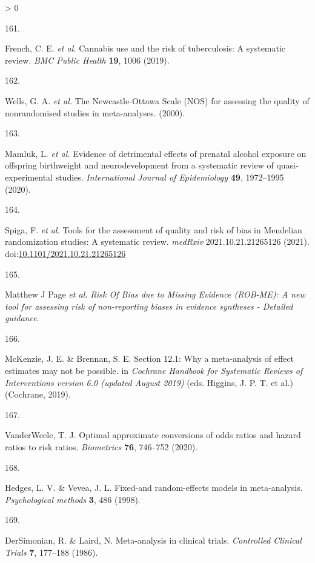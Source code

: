 \documentclass[a4paper, twoside]{templates/ociamthesis}
\newlength{\cslhangindent}
\newlength{\csllabelwidth}
\newenvironment{CSLReferences}[3] %
 {%
  \setlength{\parindent}{0pt}
  \ifodd #1 \everypar{\setlength{\hangindent}{\cslhangindent}}\ignorespaces\fi
  \ifnum #2 > 0
  \setlength{\parskip}{#2\baselineskip}
  \fi
 }%
 {}
\newcommand{\CSLLeftMargin}[1]{\parbox[t]{\maxof{\widthof{#1}}{\csllabelwidth}}{#1}}
\newcommand{\CSLRightInline}[1]{\parbox[t]{\linewidth - \csllabelwidth}{#1}}
\begin{document}
\begin{CSLReferences}{0}{0}
\leavevmode\hypertarget{ref-french2019}{}%
\CSLLeftMargin{161. }
\CSLRightInline{French, C. E. \emph{et al.} Cannabis use and the risk of tuberculosis: A systematic review. \emph{BMC Public Health} \textbf{19}, 1006 (2019).}

\leavevmode\hypertarget{ref-wells2000}{}%
\CSLLeftMargin{162. }
\CSLRightInline{Wells, G. A. \emph{et al.} The {Newcastle}-{Ottawa Scale} ({NOS}) for assessing the quality of nonrandomised studies in meta-analyses. (2000).}

\leavevmode\hypertarget{ref-mamluk2020}{}%
\CSLLeftMargin{163. }
\CSLRightInline{Mamluk, L. \emph{et al.} Evidence of detrimental effects of prenatal alcohol exposure on offspring birthweight and neurodevelopment from a systematic review of quasi-experimental studies. \emph{International Journal of Epidemiology} \textbf{49}, 1972--1995 (2020).}

\leavevmode\hypertarget{ref-spiga2021}{}%
\CSLLeftMargin{164. }
\CSLRightInline{Spiga, F. \emph{et al.} Tools for the assessment of quality and risk of bias in {Mendelian} randomization studies: A systematic review. \emph{medRxiv} 2021.10.21.21265126 (2021). doi:\href{https://doi.org/10.1101/2021.10.21.21265126}{10.1101/2021.10.21.21265126}}

\leavevmode\hypertarget{ref-zotero-15123}{}%
\CSLLeftMargin{165. }
\CSLRightInline{Matthew J Page \emph{et al.} \emph{Risk {Of Bias} due to {Missing Evidence} ({ROB}-{ME}): A new tool for assessing risk of non-reporting biases in evidence syntheses - {Detailed} guidance}.}

\leavevmode\hypertarget{ref-mckenzie2019}{}%
\CSLLeftMargin{166. }
\CSLRightInline{McKenzie, J. E. \& Brennan, S. E. Section 12.1: Why a meta-analysis of effect estimates may not be possible. in \emph{Cochrane {Handbook} for {Systematic Reviews} of {Interventions} version 6.0 (updated {August} 2019)} (eds. Higgins, J. P. T. et al.) ({Cochrane}, 2019).}

\leavevmode\hypertarget{ref-vanderweele2020}{}%
\CSLLeftMargin{167. }
\CSLRightInline{VanderWeele, T. J. Optimal approximate conversions of odds ratios and hazard ratios to risk ratios. \emph{Biometrics} \textbf{76}, 746--752 (2020).}

\leavevmode\hypertarget{ref-hedges1998}{}%
\CSLLeftMargin{168. }
\CSLRightInline{Hedges, L. V. \& Vevea, J. L. Fixed-and random-effects models in meta-analysis. \emph{Psychological methods} \textbf{3}, 486 (1998).}

\leavevmode\hypertarget{ref-dersimonian1986}{}%
\CSLLeftMargin{169. }
\CSLRightInline{DerSimonian, R. \& Laird, N. Meta-analysis in clinical trials. \emph{Controlled Clinical Trials} \textbf{7}, 177--188 (1986).}


\end{CSLReferences}
\end{document}

